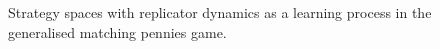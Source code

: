 \documentclass[a4paper,10pt]{article}
\numberwithin{equation}{section}
\begin{document}
\begin{figure}[h]
\begin{center}
\hfill
{}
\captionsetup{width=400pt}
\caption{Strategy spaces with replicator dynamics as a learning process in the generalised matching pennies game.}
\label{fig:Graph3.pdf and Graph4.pdf}
\end{center}
\end{figure}
\end{document}
